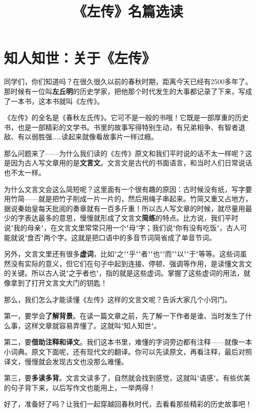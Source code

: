 \documentclass[a4paper,12pt]{ctexart}
\title{\textcolor{blue!70!black}{\Huge\textbf{《左传》名篇选读}}}
\author{}
\date{}
\begin{document}
\maketitle
\thispagestyle{empty}

\section*{\textcolor{blue!70!black}{知人知世：关于《左传》}}

同学们，你们知道吗？在很久很久以前的春秋时期，距离今天已经有2500多年了。那时候有一位叫\textbf{左丘明}的历史学家，把他那个时代发生的大事都记录了下来，写成了一本书，这本书就叫《左传》。

《左传》的全名是《春秋左氏传》。它可不是一般的书哦！它既是一部厚重的历史书，也是一部精彩的文学书。书里的故事写得特别生动，有兄弟相争、有智者退敌、有以弱胜强……读起来就像看故事片一样过瘾。

那么问题来了——为什么我们读的《左传》原文和我们平时说的话不太一样呢？这是因为古人写文章用的是\textbf{文言文}。文言文是古代的书面语言，和当时人们日常说话也不太一样。

为什么文言文会这么简短呢？这里面有一个很有趣的原因：古时候没有纸，写字要用竹简——就是把竹子削成一片一片的，然后用绳子串起来。竹简又重又占地方，据说秦始皇每天批阅的奏章就有一百多斤重！所以古人写文章的时候，就尽量用最少的字表达最多的意思，慢慢就形成了文言文\textbf{简练}的特点。比方说，我们平时说"我的母亲"，在文言文里常常只用一个"母"字；我们说"你有没有吃饭"，古人可能就说"食否"两个字。这就是把口语中的多音节词简省成了单音节词。

另外，文言文里还有很多\textbf{虚词}，比如"之""乎""者""也""而""以""于"等等。这些词虽然没有实际的意义，但它们在句子中起到连接、停顿、强调等作用，是读懂文言文的关键。所以古人说"之乎者也"，指的就是这些虚词。掌握了这些虚词的用法，就像拿到了打开文言文大门的钥匙！

那么，我们怎么才能读懂《左传》这样的文言文呢？告诉大家几个小窍门。

第一，要学会\textbf{了解背景}。在读一篇文章之前，先了解一下作者是谁、当时发生了什么事，这样文章就容易弄懂了。这就叫"知人知世"。

第二，要\textbf{借助注释和译文}。我们这本书里，难懂的字词旁边都有注释——就像一本小词典。原文下面呢，还有现代文的翻译。你可以先读原文，再看注释，最后对照译文，慢慢就会发现古文也没那么难懂。

第三，要\textbf{多读多背}。文言文读多了，自然就会找到感觉，这就叫"语感"。有些优美的句子背下来，以后写作文也能用上，一举两得！

好了，准备好了吗？让我们一起穿越回春秋时代，去看看那些精彩的历史故事吧！
\end{document}
